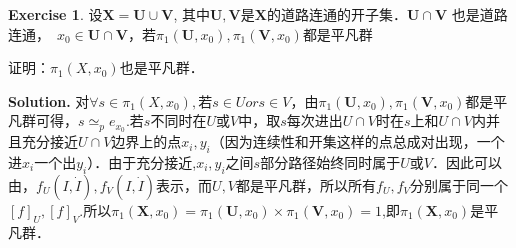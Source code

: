 \documentclass[a4paper]{book}
\newenvironment{solution}%
{\noindent\textbf{Solution.}}%
{\qedhere}
\numberwithin{equation}{chapter}
\theoremstyle{definition}
\newtheorem{exc}[exm]{Exercise}
\begin{document}
\begin{multicols}{2}
\begin{exc}
	设$ \mathbf{X} = \mathbf{U} \cup \mathbf{V} $, 其中$ \mathbf{U}, \mathbf{V} $是$ \mathbf{X} $的道路连通的开子集．$ \mathbf{U} \cap \mathbf{V} $ 也是道路连通，　$ x_0 \in  \mathbf{U} \cap \mathbf{V} $，若$ \pi_1(\mathbf{U}, x_0), \pi_1(\mathbf{V}, x_0) $都是平凡群
	
	证明：$ \pi_1(X, x_0) $也是平凡群．
\end{exc}

\begin{solution}
	对$ \forall s \in \pi_1(X, x_0), $若$ s \in U or s \in V $，由$ \pi_1(\mathbf{U}, x_0), \pi_1(\mathbf{V}, x_0) $都是平凡群可得，$ s \simeq_p e_{x_0} $.若$ s $不同时在$ U $或$ V $中，取$ s $每次进出$ U \cap V $时在$ s $上和$ U \cap V $内并且充分接近$ U \cap V $边界上的点$ x_i, y_i $（因为连续性和开集这样的点总成对出现，一个进$ x_i $一个出$ y_i $）．由于充分接近,$ x_i,y_i $之间$ s $部分路径始终同时属于$ U $或$ V $．因此可以由$ ，f_U(I,\dot{I}),f_V(I,\dot{I}) $表示，而$ U,V $都是平凡群，所以所有$ f_U,f_V $分别属于同一个$ [f]_U,[f]_V $.所以$\pi_1(\mathbf{X}, x_0) = \pi_1(\mathbf{U}, x_0) \times \pi_1(\mathbf{V}, x_0) = {1}$,即$ \pi_1(\mathbf{X}, x_0) $是平凡群．

\end{solution}
%

%

%


\end{multicols}
\end{document}
